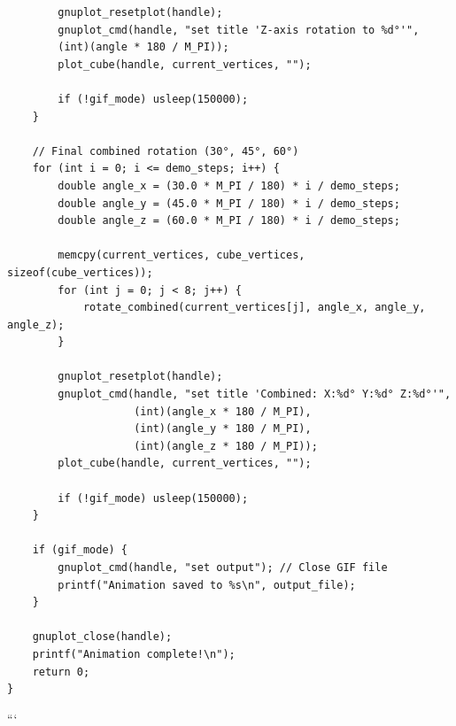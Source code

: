 \documentclass[a4paper,10pt]{article}
\begin{document}
\begin{verbatim}
        gnuplot_resetplot(handle);
        gnuplot_cmd(handle, "set title 'Z-axis rotation to %d°'",
        (int)(angle * 180 / M_PI));
        plot_cube(handle, current_vertices, "");

        if (!gif_mode) usleep(150000);
    }

    // Final combined rotation (30°, 45°, 60°)
    for (int i = 0; i <= demo_steps; i++) {
        double angle_x = (30.0 * M_PI / 180) * i / demo_steps;
        double angle_y = (45.0 * M_PI / 180) * i / demo_steps;
        double angle_z = (60.0 * M_PI / 180) * i / demo_steps;

        memcpy(current_vertices, cube_vertices, sizeof(cube_vertices));
        for (int j = 0; j < 8; j++) {
            rotate_combined(current_vertices[j], angle_x, angle_y, angle_z);
        }

        gnuplot_resetplot(handle);
        gnuplot_cmd(handle, "set title 'Combined: X:%d° Y:%d° Z:%d°'",
                    (int)(angle_x * 180 / M_PI),
                    (int)(angle_y * 180 / M_PI),
                    (int)(angle_z * 180 / M_PI));
        plot_cube(handle, current_vertices, "");

        if (!gif_mode) usleep(150000);
    }

    if (gif_mode) {
        gnuplot_cmd(handle, "set output"); // Close GIF file
        printf("Animation saved to %s\n", output_file);
    }

    gnuplot_close(handle);
    printf("Animation complete!\n");
    return 0;
}
\end{verbatim}
```\\
\end{document}
